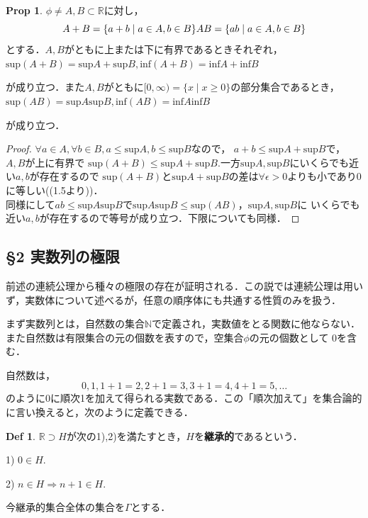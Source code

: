 \documentclass{ltjsarticle}
\theoremstyle{definition}
\newtheorem{definition}{Def}[subsection]
\newtheorem{prop}[thm]{Prop}
\theoremstyle{propcorollarystyle}
\theoremstyle{thmcorollarystyle}
\begin{document}
\begin{prop}
  $\phi \neq A,B \subset \mathbb{R}$に対し，\\
  \[
  A+B=\{a+b \mid a \in A, b \in B\}\\
  AB=\{ab \mid a \in A, b \in B\}
  \]
  とする．$A,B$がともに上または下に有界であるときそれぞれ，\\

  \noindent
  \hfill
  $\text{sup}(A+B)=\text{sup}A+\text{sup}B, \text{inf}(A+B)=\text{inf}A+\text{inf}B$
  \hfill\null\noindent\par
  が成り立つ．また$A,B$がともに$[0, \infty)=\{x \mid x\ge 0\}$の部分集合であるとき，\\
  \noindent
  \hfil
  $\text{sup}(AB)=\text{sup}A\text{sup}B, \text{inf}(AB)=\text{inf}A\text{inf}B$
  \hfil\null\noindent\par
  が成り立つ．
\end{prop}
\begin{proof}
  $\forall a \in A, \forall b \in B, a \le \text{sup}A, b \le \text{sup}B$なので，
  $a+b \le \text{sup}A+\text{sup}B$で，$A,B$が上に有界で
  $\text{sup}(A+B) \le \text{sup}A+\text{sup}B$.一方$\text{sup}A,\text{sup}B$にいくらでも近い$a,b$が存在するので
  $\text{sup}(A+B)と\text{sup}A+\text{sup}B$の差は$\forall \epsilon >0$よりも小であり0に等しい((1.5より))．\\
  同様にして$ab \le \text{sup}A \text{sup}B$で$\text{sup}A\text{sup}B \le \text{sup}(AB)$，$\text{sup}A,\text{sup}B$に
  いくらでも近い$a,b$が存在するので等号が成り立つ．下限についても同様．
\end{proof}


\subsection*{\S2 実数列の極限}
前述の連続公理から種々の極限の存在が証明される．この説では連続公理は用いず，実数体について述べるが，任意の順序体にも共通する性質のみを扱う．\par
まず実数列とは，自然数の集合$\mathbb{N}$で定義され，実数値をとる関数に他ならない．また自然数は有限集合の元の個数を表すので，空集合$\phi$の元の個数として
0を含む．\par
自然数は，
\begin{equation*}
  0, 1, 1+1=2, 2+1=3, 3+1=4, 4+1=5, \dots
\end{equation*}
のように0に順次1を加えて得られる実数である．この「順次加えて」を集合論的に言い換えると，次のように定義できる．
\begin{definition}
  $\mathbb{R} \supset H$が次の1),2)を満たすとき，$H$を\textbf{継承的}であるという．\par
  1) $0 \in H$.\par
  2) $n \in H \Rightarrow n+1 \in H$.\par
\end{definition}
今継承的集合全体の集合を$\varGamma$とする．\par
\end{document}
